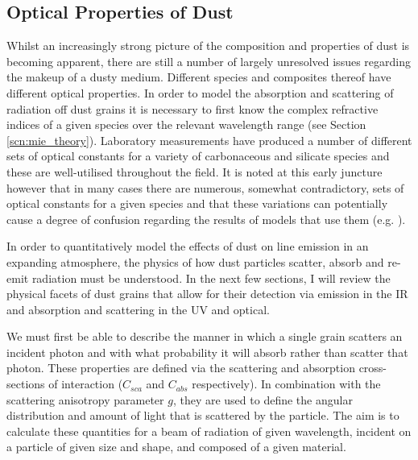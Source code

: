 

\subsection{Optical Properties of Dust}
\label{opt_prop}
Whilst an increasingly strong picture of the composition and properties of dust is becoming apparent, there are still a number of largely unresolved issues regarding the makeup of a dusty medium.
Different species and composites thereof have different optical properties.  In order to model the absorption and scattering of radiation off dust grains it is necessary to first know the complex refractive indices of a given species over the relevant wavelength range (see Section \ref{scn:mie_theory}).  Laboratory measurements have produced a number of different sets of optical constants for a variety of carbonaceous and silicate species and these are well-utilised throughout the field.  It is noted at this early juncture however that in many cases there are numerous, somewhat contradictory, sets of optical constants for a given species and that these variations can potentially cause a degree of confusion regarding the results of models that use them (e.g. \citet{Owen2015}).  

In order to quantitatively model the effects of dust on line emission in an expanding atmosphere, the physics of how dust particles scatter, absorb and re-emit radiation must be understood. In the next few sections, I will review the physical facets of dust grains that allow for their detection via emission in the IR and absorption and scattering in the UV and optical.   

We must first be able to describe the manner in which a single grain scatters an incident photon and with what probability it will absorb rather than scatter that photon. These properties are defined via the scattering and absorption cross-sections of interaction ($C_{sca}$ and $C_{abs}$ respectively).  In combination with the scattering anisotropy parameter $g$, they are used to define the angular distribution and amount of  light that is scattered by the particle.  The aim is to calculate these quantities for a beam of radiation of given wavelength, incident on a particle of given size and shape, and composed of a given material.   

